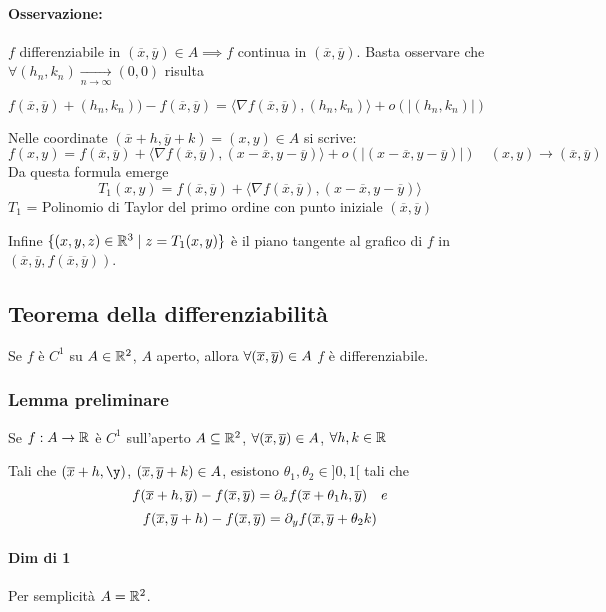 \documentclass[a4paper]{article}
\begin{document}
\paragraph{Osservazione:} $f$ differenziabile in $(\overline x, \overline y) \in A \implies f$ continua in $(\overline x, \overline y)$.
		Basta osservare che $\forall (h_n,k_n) \xrightarrow[n \to \infty]{} (0,0)$ risulta 

		$f(\overline x, \overline y)+(h_n,k_n))-f(\overline x, \overline y) = \langle \nabla f (\overline x, \overline y),(h_n,k_n) \rangle + o(|(h_n,k_n)|)$

Nelle coordinate $ (\overline x+h, \overline y+k)=(x,y) \in A $ si scrive:
$$
f(x,y) = f(\overline x, \overline y)+\langle \nabla f (\overline x, \overline y), (x-\overline x, y-\overline y) \rangle + o (|(x-\overline x, y-\overline y)|) \quad (x,y) \to (\overline x, \overline y)
$$
Da questa formula emerge
$$
T_1(x,y) = f(\overline x, \overline y)+\langle \nabla f (\overline x, \overline y), (x-\overline x, y-\overline y) \rangle
$$
$T_1$ = Polinomio di Taylor del primo ordine con punto iniziale $(\overline x, \overline y)$

Infine $\{(x,y,z)\in \mathbb{R}^3 \mid z = T_1(x,y)\}$ è il piano tangente al grafico di $f$ in $(\overline x, \overline y,f(\overline x, \overline y))$.

\subsection{Teorema della differenziabilità}
\begin{center}
Se $f$ è $C^1$ su $A \in \mathbb{R}^2$, $A$ aperto, allora $\forall (\overline{x},\overline{y}) \in A$ $f$ è differenziabile.
\end{center}

\subsubsection{Lemma preliminare}
Se $f:A \to \mathbb{R}$ è $C^1$ sull'aperto $A \subseteq \mathbb{R}^2$, $\forall (\overline{x},\overline{y}) \in A$, $\forall h,k \in \mathbb{R}$

Tali che $(\ox +h , \y)$, $(\overline{x}, \overline{y}+k) \in A$, esistono $\theta _1, \theta_2 \in ]0,1[$ tali che 
$$
f(\overline{x}+h, \overline{y}) - f(\overline{x}, \overline{y}) = \partial_x f (\overline{x} + \theta_1 h , \overline{y}) \quad e
$$$$
f(\overline{x},\overline{y} +h) - f(\overline{x}, \overline{y}) = \partial_y f (\overline{x}, \overline{y} + \theta_2 k)
$$

\paragraph { Dim di 1 }
Per semplicità $A = \mathbb{R} ^2$.
\end{document}

